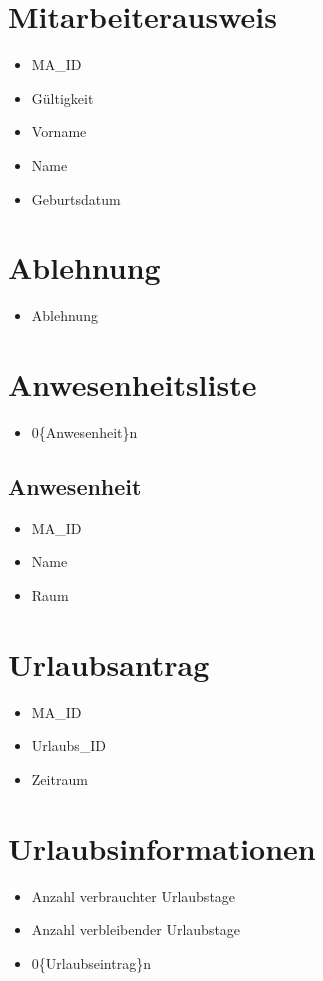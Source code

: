 \section{Mitarbeiterausweis}
\begin{itemize}[label=+]
\item[] MA\_ID
\item Gültigkeit
\item Vorname
\item Name
\item Geburtsdatum
\end{itemize}
\section{Ablehnung}
\begin{itemize}
\item[] Ablehnung
\end{itemize}
\section{Anwesenheitsliste}
\begin{itemize}
\item[] 0\{Anwesenheit\}n
\end{itemize}
\subsection{Anwesenheit}
\begin{itemize}[label=+]
\item[] MA\_ID
\item Name
\item Raum
\end{itemize}
\section{Urlaubsantrag}
\begin{itemize}[label=+]
\item[] MA\_ID
\item Urlaubs\_ID
\item Zeitraum
\end{itemize}
\section{Urlaubsinformationen}
\begin{itemize}[label=+]
\item[] Anzahl verbrauchter Urlaubstage
\item Anzahl verbleibender Urlaubstage
\item 0\{Urlaubseintrag\}n
\end{itemize}
